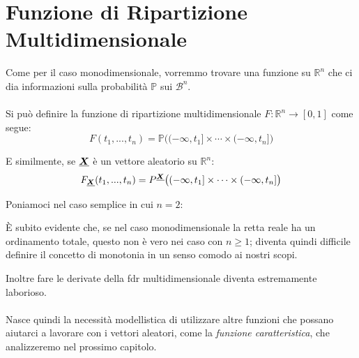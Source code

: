\section{Funzione di Ripartizione Multidimensionale}

Come per il caso monodimensionale, vorremmo trovare una funzione su $\mathbb{R}^n$ che ci dia informazioni sulla probabilità $\mathbb{P}$ sui $\mathcal{B}^n$.\\
\\
Si può definire la funzione di ripartizione multidimensionale $F:\mathbb{R}^n\to[0, 1]$ come segue:
\[F(t_1, ..., t_n) = \mathbb{P}\bigl((-\infty, t_1]\times \cdots \times(-\infty, t_n]\bigr)\]

E similmente, se $\underline{{\boldsymbol{X}}}$ è un vettore aleatorio su $\mathbb{R}^n$:
\[F_{\underline{{\boldsymbol{X}}}}(t_1, ..., t_n) = P^{\underline{{\boldsymbol{X}}}}\bigl((-\infty, t_1]\times \cdots \times(-\infty, t_n]\bigr)\]

\begin{esempio}
    Poniamoci nel caso semplice in cui $n=2$:
    \begin{figure}[H]
\centering
{}
\end{figure}
\end{esempio}





È subito evidente che, se nel caso monodimensionale la retta reale ha un ordinamento totale, questo non è vero nei caso con $n\geq1$; diventa quindi difficile definire il concetto di monotonia in un senso comodo ai nostri scopi.

\medskip
\noindent Inoltre fare le derivate della fdr multidimensionale diventa estremamente laborioso.\\
\\
Nasce quindi la necessità modellistica di utilizzare altre funzioni che possano aiutarci a lavorare con i vettori aleatori, come la \textit{funzione caratteristica}, che analizzeremo nel prossimo capitolo.


    



